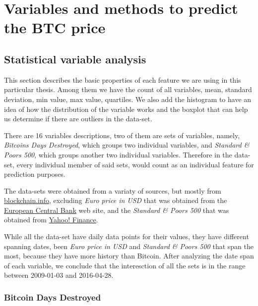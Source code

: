 
\chapter{Variables and methods to predict the BTC price} %

\label{ch:variables}


\section{Statistical variable analysis}
\label{sec:stat-var-analysis}

This section describes the basic properties of each feature we are
using in this particular thesis. Among them we have the count of all
variables, mean, standard deviation, min value, max value, quartiles.
We also add the histogram to have an idea of how the distribution of
the variable works and the boxplot that can help us determine if there
are outliers in the data-set.

There are 16 variables descriptions, two of them are sets of
variables, namely, \textit{Bitcoins Days Destroyed}, which groups two
individual variables, and \textit{Standard \& Poors 500}, which groups
another two individual variables. Therefore in the data-set, every
individual member of said sets, would count as an individual feature
for prediction purposes.

The data-sets were obtained from a variaty of sources, but mostly from
\href{https://blockchain.info/charts}{blockchain.info}, excluding
\textit{Euro price in USD} that was obtained from the
\href{https://www.ecb.europa.eu/stats/exchange/eurofxref/html/index.en.html}{European
  Central Bank} web site, and the \textit{Standard \& Poors 500} that
was obtained from
\href{https://finance.yahoo.com/q/hp?s=^GSPC\&a=00\&b=3\&c=1950\&d=05\&e=8\&f=2016\&g=d}{Yahoo!
  Finance}.

While all the data-set have daily data points for their values, they
have different spanning dates, been \textit{Euro price in USD} and
\textit{Standard \& Poors 500} that span the most, because they have
more history than Bitcoin. After analyzing the date span of each
variable, we conclude that the interesction of all the sets is in the
range between 2009-01-03 and 2016-04-28.

\subsection{Bitcoin Days Destroyed}
\label{sec:bitcoin-days-destroyed}

